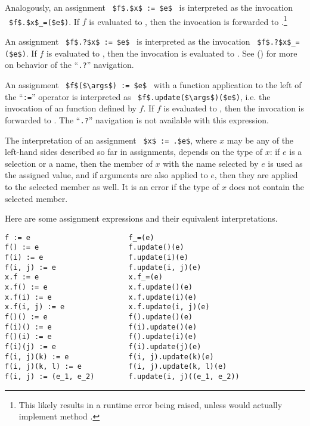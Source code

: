 Analogously, an assignment ~\lstinline!$f$.$x$ := $e$!~ is interpreted as the invocation ~\lstinline!$f$.$x$_=($e$)!. If $f$ is evaluated to , then the invocation is forwarded to .\footnote{This likely results in a runtime error being raised, unless  would actually implement method .} 

An assignment ~\lstinline!$f$.?$x$ := $e$!~ is interpreted as the invocation ~\lstinline!$f$.?$x$_=($e$)!. If $f$ is evaluated to , then the invocation is evaluated to . See () for more on behavior of the ``\lstinline!.?!'' navigation. 

An assignment ~\lstinline!$f$($\args$) := $e$!~ with a function application to the left of the ``\lstinline!:=!'' operator is interpreted as ~\lstinline!$f$.update($\args$)($e$)!, i.e. the invocation of an  function defined by $f$. If $f$ is evaluated to , then the invocation is forwarded to . The ``\lstinline!.?!'' navigation is not available with this expression. 

The interpretation of an assignment ~\lstinline!$x$ := .$e$!, where $x$ may be any of the left-hand sides described so far in assignments, depends on the type of $x$: if $e$ is a selection or a name, then the member of $x$ with the name selected by $e$ is used as the assigned value, and if arguments are also applied to $e$, then they are applied to the selected member as well. It is an error if the type of $x$ does not contain the selected member. 

\example Here are some assignment expressions and their equivalent interpretations. 
\begin{lstlisting}
f := e                       f_=(e)
f() := e                     f.update()(e)
f(i) := e                    f.update(i)(e)
f(i, j) := e                 f.update(i, j)(e)
x.f := e                     x.f_=(e)
x.f() := e                   x.f.update()(e)
x.f(i) := e                  x.f.update(i)(e)
x.f(i, j) := e               x.f.update(i, j)(e)
f()() := e                   f().update()(e)
f(i)() := e                  f(i).update()(e)
f()(i) := e                  f().update(i)(e)
f(i)(j) := e                 f(i).update(j)(e)
f(i, j)(k) := e              f(i, j).update(k)(e)
f(i, j)(k, l) := e           f(i, j).update(k, l)(e)
f(i, j) := (e_1, e_2)        f.update(i, j)((e_1, e_2))
\end{lstlisting}






